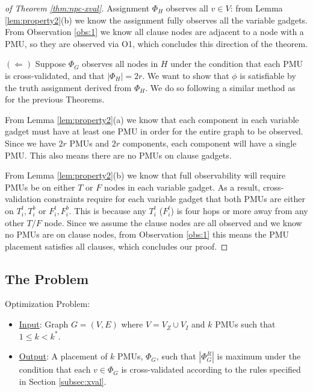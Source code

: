 \begin{proof}[of Theorem \ref{thm:npc-xval}]
Assignment $\Phi_H$ observes all $v \in V$: from Lemma \ref{lem:property2}(b) we know the assignment fully observes all the variable gadgets. From Observation \ref{obs:1} we know all clause nodes are adjacent to a node with a PMU, so they are observed via O1, which concludes this direction of the theorem.

$(\Leftarrow)$ Suppose $\Phi_G$ observes all nodes in $H$
under the condition that each PMU is cross-validated, and that $|\Phi_H|=2r$. We want to show that
$\phi$ is satisfiable by the truth assignment derived from $\Phi_H$. We do so following a similar method as for the previous Theorems.

From Lemma \ref{lem:property2}(a) we know that each component in each variable gadget must have at least one PMU in order for the entire graph to be observed. Since we have $2r$ PMUs and $2r$ components, each component will have a single PMU. This also means there are no PMUs on clause gadgets.

From Lemma \ref{lem:property2}(b) we know that full observability will require PMUs  be on either $T$ or $F$ nodes in each variable gadget. As a result,  cross-validation constraints require for each variable gadget that both PMUs are either on $T_i^t, T_i^b$ or $F_i^t, F_i^b$. This is because any $T_i^t$ ($F_i^t$) is four hops or more away from any other $T/F$ node. Since we assume the clause nodes are all observed and we know no PMUs are on clause nodes, from Observation \ref{obs:1} this means the PMU placement satisfies all clauses, which concludes our proof.
\end{proof}



\subsection{The \xvalpart Problem}
\label{subsec:xvalpart}

\xvalpart Optimization Problem:
\begin{itemize}

	\item \underline{Input}: Graph $G=(V,E)$ where $V=V_Z \cup V_I$ and $k$ PMUs such that $1 \leq k < k^*$.

	\item \underline{Output}: A placement of $k$ PMUs, $\Phi_G$, such that $|\Phi^R_G|$ is maximum under the condition that
	each $v \in \Phi_G$ is cross-validated according to the rules specified in Section \ref{subsec:xval}.
\end{itemize}


